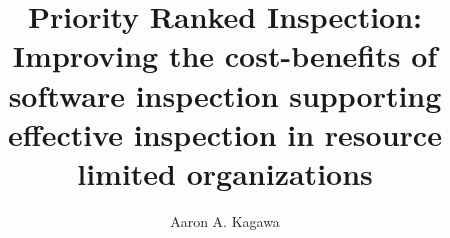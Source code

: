 \documentclass[11pt,proposal,times,thesis,actual]{uhthesis2e}
\begin{document}
\title{Priority Ranked Inspection: \\ Improving the cost-benefits of
  software inspection supporting effective inspection in resource
  limited organizations}
\author{Aaron A. Kagawa}

\maketitle

\begin{frontmatter}

\tableofcontents
\listoftables
\listoffigures
\end{frontmatter}












\end{document}
